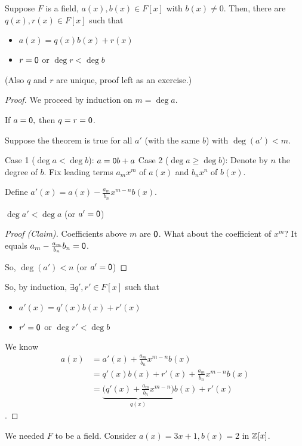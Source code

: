 \documentclass[notes.tex]{subfiles}
\begin{document}
\begin{theorem}
	\label{thm:polydivalg}
	Suppose $F$ is a field, $a(x), b(x)\in F[x]$ with $b(x)\ne 0$. Then, there are $q(x), r(x) \in F[x]$ such that
	\begin{itemize}
		\item $a(x) = q(x)b(x) + r(x)$
		\item $r = \mathsf{0}$ or $\deg r < \deg b$
	\end{itemize}
	(Also $q$ and $r$ are unique, proof left as an exercise.)
\end{theorem}
\begin{proof}
	We proceed by induction on $m = \deg a$.

	If $a=\mathsf{0},$ then $q=r=\mathsf{0}$.

	Suppose the theorem is true for all $a'$ (with the same $b$) with $\deg(a') < m$.

	Case 1 ($\deg a < \deg b$):
	\tabin
		$a = \mathsf{0} b + a$
	\tabout
	Case 2 ($\deg a \ge \deg b$):
	\tabin
		Denote by $n$ the degree of $b$.
		Fix leading terms $a_mx^m$ of $a(x)$ and $b_nx^n$ of $b(x)$.

		Define $a'(x) = a(x) - \frac{a_m}{b_n}x^{m-n}b(x)$.

		\begin{claim}
			$\deg a' < \deg a$
			(or $a'=\mathsf{0}$)
		\end{claim}
		\begin{proof}[Proof (Claim)]
			Coefficients above $m$ are $\mathsf{0}$. What about the coefficient of $x^m$? It equals $a_m - \frac{a_m}{b_n}b_n = \mathsf{0}$.

			So, $\deg(a') < n$ (or $a' = \mathsf{0}$)
		\end{proof}
		So, by induction, $\exists q', r'\in F[x]$ such that
		\begin{itemize}
			\item $a'(x) = q'(x)b(x) + r'(x)$
			\item $r'=\mathsf{0}$ or $\deg r' < \deg b$
		\end{itemize}
		We know \begin{align*}
			a(x)&=a'(x) + \frac{a_m}{b_n}x^{m-n}b(x)\\
			&= q'(x)b(x) + r'(x) + \frac{a_m}{b_n}x^{m-n}b(x)\\
			&= \underbrace{\big(q'(x) + \frac{a_m}{b_n}x^{m-n}\big)}_{q(x)}b(x) + r'(x)
		\end{align*}.
	\tabout
\end{proof}

We needed $F$ to be a field. Consider $a(x) = 3x+1, b(x) = 2$ in $\mathbb{Z}[x]$.
\end{document}
